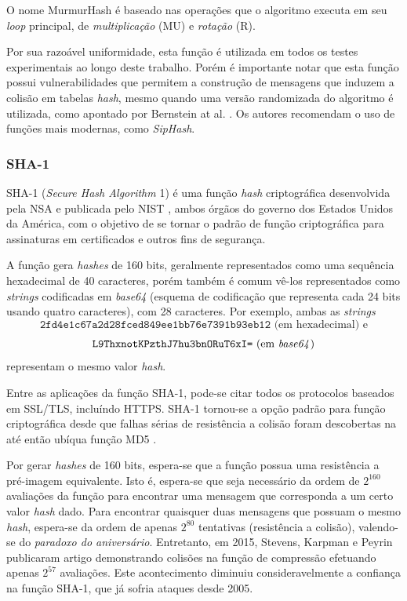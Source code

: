 O nome MurmurHash é baseado nas operações que o algoritmo executa em seu \emph{loop} principal, de \emph{multiplicação} (MU) e \emph{rotação} (R). 

Por sua razoável uniformidade, esta função é utilizada em todos os testes experimentais ao longo deste trabalho. Porém é importante notar que esta função possui vulnerabilidades que permitem a construção de mensagens que induzem a colisão em tabelas \emph{hash}, mesmo quando uma versão randomizada do algoritmo é utilizada, como apontado por Bernstein at al. \cite{bernsteinhash}. Os autores recomendam o uso de funções mais modernas, como \emph{SipHash}.

\subsubsection{SHA-1}

SHA-1 (\emph{Secure Hash Algorithm} 1) é uma função \emph{hash} criptográfica desenvolvida pela NSA e publicada pelo NIST \cite{fips2012180}, ambos órgãos do governo dos Estados Unidos da América, com o objetivo de se tornar o padrão de função criptográfica para assinaturas em certificados e outros fins de segurança.

A função gera \emph{hashes} de 160 bits, geralmente representados como uma sequência hexadecimal de 40 caracteres, porém também é comum vê-los representados como \emph{strings} codificadas em \emph{base64} (esquema de codificação que representa cada 24 bits usando quatro caracteres), com 28 caracteres. Por exemplo, ambas as \emph{strings} 
\[
\texttt{2fd4e1c67a2d28fced849ee1bb76e7391b93eb12} \text{ (em hexadecimal) e}
\]
\[
\texttt{L9ThxnotKPzthJ7hu3bnORuT6xI=} \text{ (em \emph{base64})}
\]
representam o mesmo valor \emph{hash}.

Entre as aplicações da função SHA-1, pode-se citar todos os protocolos baseados em SSL/TLS, incluíndo HTTPS. SHA-1 tornou-se a opção padrão para função criptográfica desde que falhas sérias de resistência a colisão foram descobertas na até então ubíqua função MD5 \cite{wang2005break}.

Por gerar \emph{hashes} de 160 bits, espera-se que a função possua uma resistência a pré-imagem equivalente. Isto é, espera-se que seja necessário da ordem de $2^{160}$ avaliações da função para encontrar uma mensagem que corresponda a um certo valor \emph{hash} dado. Para encontrar quaisquer duas mensagens que possuam o mesmo \emph{hash}, espera-se da ordem de apenas $2^{80}$ tentativas (resistência a colisão), valendo-se do \emph{paradoxo do aniversário}. Entretanto, em 2015, Stevens, Karpman e Peyrin \cite{cryptoeprint:2015:967} publicaram artigo demonstrando colisões na função de compressão efetuando apenas $2^{57}$ avaliações. Este acontecimento diminuiu consideravelmente a confiança na função SHA-1, que já sofria ataques desde 2005.

